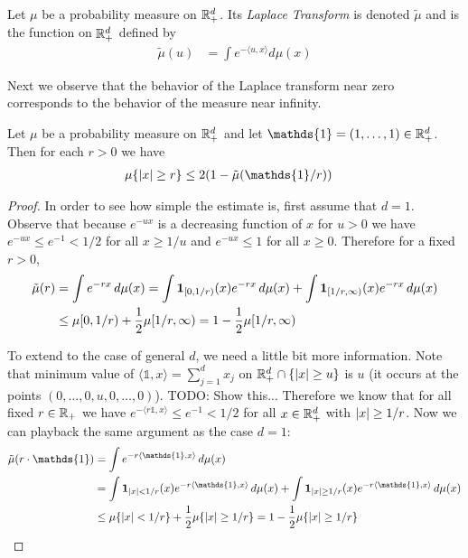 \begin{defn}Let $\mu$ be a probability measure on $\mathbb{R}^d_+$. Its
  \emph{Laplace Transform} is denoted $\tilde{\mu}$ and is the function on
  $\mathbb{R}^d_+$ defined by 
\begin{align*}
\tilde{\mu}(u) &= \int e^{-\langle u,x \rangle} d \mu(x)
\end{align*}
\end{defn}

Next we observe that the behavior of the Laplace transform near zero
corresponds to the behavior of the measure near infinity.
\begin{lem}\label{LaplaceTailEstimate}Let $\mu$ be a probability
  measure on $\mathbb{R}^d_+$ and let $\mathds{1}=(1, \dotsc, 1) \in
  \reals^d_+$.  Then for each $r > 0$ we have
\begin{align*}
\mu\lbrace \abs{x} \geq r\rbrace &\leq 2(1 - \tilde{\mu}(\mathds{1}/r))
\end{align*}
\end{lem}
\begin{proof}
In order to see how simple the estimate is, first assume that $d=1$.
Observe that because $e^{-ux}$ is a decreasing function of $x$ for $u
> 0$ we have $e^{-ux}  \leq e^{-1} < 1/2$ for all $x
\geq 1/u$ and $e^{-ux} \leq 1$ for all $x \geq 0$.  Therefore for a fixed $r > 0$,
\begin{align*}
\tilde{\mu}(r) &= \int e^{-rx} \, d\mu(x) = \int \textbf{1}_{[0,1/r)}(x)  e^{-rx}
\, d\mu(x)  + \int \textbf{1}_{[1/r,\infty)}(x)  e^{-rx} \,
d\mu(x)  \\
&\leq \mu[0,1/r) + \frac{1}{2} \mu[1/r, \infty) = 1 - \frac{1}{2} \mu[1/r, \infty) 
\end{align*}

To extend to the case of general $d$, we need a little bit more
information.  Note that minimum value of
$\langle \mathds{1}, x\rangle = \sum_{j=1}^d x_j$ on $\mathbb{R}^d_+ \cap \lbrace \left \vert x \right \vert \geq u \rbrace$ is
$u$ (it occurs at the points $(0, \dotsc, 0,u,0, \dotsc,0)$).  TODO:
Show this...
Therefore we know that for all fixed $r \in \mathbb{R}_+$ we have $e^{-\langle r
\mathds{1}, x \rangle} \leq e^{-1} < 1/2$ for all $x \in \mathbb{R}^d_+$
with $\left \vert x \right \vert \geq 1/r$.  Now we can playback the same argument as the
case $d=1$:
\begin{align*}
\tilde{\mu}(r \cdot \mathds{1}) &= \int e^{-r\langle \mathds{1}, x \rangle}
\, d\mu(x) \\
&= \int \characteristic{\abs{x} < 1/r}(x)  e^{-r\langle \mathds{1}, x \rangle}
\, d\mu(x)  + \int \characteristic{\abs{x} \geq 1/r}(x)  e^{-r\langle \mathds{1}, x \rangle} \,
d\mu(x)  \\
&\leq \mu \lbrace \abs{x} < 1/r \rbrace + \frac{1}{2} \mu \lbrace
\abs{x} \geq 1/r \rbrace = 1 - \frac{1}{2} \mu \lbrace \abs{x} \geq
1/r \rbrace
\end{align*}
\end{proof}

